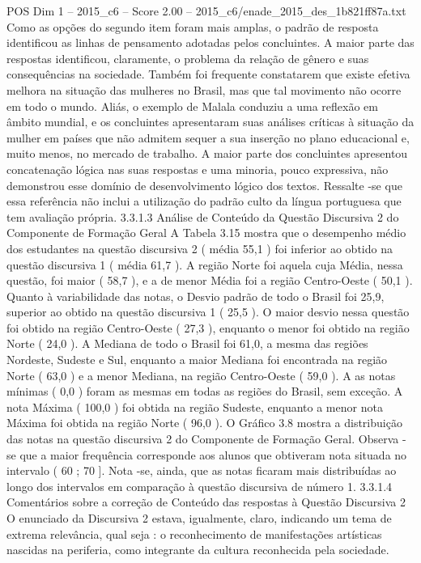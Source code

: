 \begin{textsample}{POS Dim 1 – 2015\_c6 – Score 2.00 – 2015\_c6/enade\_2015\_des\_1b821ff87a.txt}
Como as opções do segundo item foram mais amplas, o padrão de resposta identificou as linhas de pensamento adotadas pelos concluintes.
A maior parte das respostas identificou, claramente, o problema da relação de gênero e suas consequências na sociedade.
Também foi frequente constatarem que existe efetiva melhora na situação das mulheres no Brasil, mas que tal movimento não ocorre em todo o mundo.
Aliás, o exemplo de Malala conduziu a uma reflexão em âmbito mundial, e os concluintes apresentaram suas análises críticas à situação da mulher em países que não admitem sequer a sua inserção no plano educacional e, muito menos, no mercado de trabalho.
A maior parte dos concluintes apresentou concatenação lógica nas suas respostas e uma minoria, pouco expressiva, não demonstrou esse domínio de desenvolvimento lógico dos textos.
Ressalte -se que essa referência não inclui a utilização do padrão culto da língua portuguesa que tem avaliação própria. 3.3.1.3 Análise de Conteúdo da Questão Discursiva 2 do Componente de Formação Geral A Tabela 3.15 mostra que o desempenho médio dos estudantes na questão discursiva 2 ( média 55,1 ) foi inferior ao obtido na questão discursiva 1 ( média 61,7 ).
A região Norte foi aquela cuja Média, nessa questão, foi maior ( 58,7 ), e a de menor Média foi a região Centro-Oeste ( 50,1 ).
Quanto à variabilidade das notas, o Desvio padrão de todo o Brasil foi 25,9, superior ao obtido na questão discursiva 1 ( 25,5 ).
O maior desvio nessa questão foi obtido na região Centro-Oeste ( 27,3 ), enquanto o menor foi obtido na região Norte ( 24,0 ).
A Mediana de todo o Brasil foi 61,0, a mesma das regiões Nordeste, Sudeste e Sul, enquanto a maior Mediana foi encontrada na região Norte ( 63,0 ) e a menor Mediana, na região Centro-Oeste ( 59,0 ).
A as notas mínimas ( 0,0 ) foram as mesmas em todas as regiões do Brasil, sem exceção.
A nota Máxima ( 100,0 ) foi obtida na região Sudeste, enquanto a menor nota Máxima foi obtida na região Norte ( 96,0 ).
O Gráfico 3.8 mostra a distribuição das notas na questão discursiva 2 do Componente de Formação Geral.
Observa -se que a maior frequência corresponde aos alunos que obtiveram nota situada no intervalo ( 60 ; 70 ].
Nota -se, ainda, que as notas ficaram mais distribuídas ao longo dos intervalos em comparação à questão discursiva de número 1. 3.3.1.4 Comentários sobre a correção de Conteúdo das respostas à Questão Discursiva 2 O enunciado da Discursiva 2 estava, igualmente, claro, indicando um tema de extrema relevância, qual seja : o reconhecimento de manifestações artísticas nascidas na periferia, como integrante da cultura reconhecida pela sociedade.

\end{textsample}
